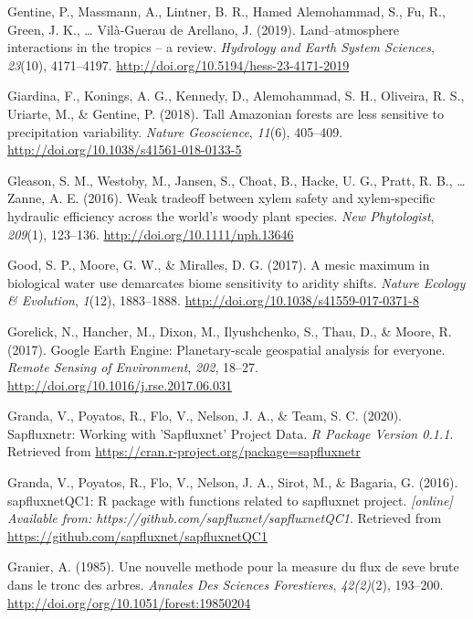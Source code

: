 \documentclass[11pt,twoside]{reedthesis}
\begin{document}
\hypertarget{ref-gentine_landatmosphere_2019}{}
Gentine, P., Massmann, A., Lintner, B. R., Hamed Alemohammad, S., Fu,
R., Green, J. K., \ldots{} Vilà-Guerau de Arellano, J. (2019).
Land--atmosphere interactions in the tropics -- a review.
\emph{Hydrology and Earth System Sciences}, \emph{23}(10), 4171--4197.
\url{http://doi.org/10.5194/hess-23-4171-2019}

\hypertarget{ref-giardina_tall_2018}{}
Giardina, F., Konings, A. G., Kennedy, D., Alemohammad, S. H., Oliveira,
R. S., Uriarte, M., \& Gentine, P. (2018). Tall Amazonian forests are
less sensitive to precipitation variability. \emph{Nature Geoscience},
\emph{11}(6), 405--409. \url{http://doi.org/10.1038/s41561-018-0133-5}

\hypertarget{ref-gleason_weak_2016}{}
Gleason, S. M., Westoby, M., Jansen, S., Choat, B., Hacke, U. G., Pratt,
R. B., \ldots{} Zanne, A. E. (2016). Weak tradeoff between xylem safety
and xylem-specific hydraulic efficiency across the world's woody plant
species. \emph{New Phytologist}, \emph{209}(1), 123--136.
\url{http://doi.org/10.1111/nph.13646}

\hypertarget{ref-good2017}{}
Good, S. P., Moore, G. W., \& Miralles, D. G. (2017). A mesic maximum in
biological water use demarcates biome sensitivity to aridity shifts.
\emph{Nature Ecology \& Evolution}, \emph{1}(12), 1883--1888.
\url{http://doi.org/10.1038/s41559-017-0371-8}

\hypertarget{ref-gorelick_google_2017}{}
Gorelick, N., Hancher, M., Dixon, M., Ilyushchenko, S., Thau, D., \&
Moore, R. (2017). Google Earth Engine: Planetary-scale geospatial
analysis for everyone. \emph{Remote Sensing of Environment}, \emph{202},
18--27. \url{http://doi.org/10.1016/j.rse.2017.06.031}

\hypertarget{ref-granda_sapfluxnetr_2020}{}
Granda, V., Poyatos, R., Flo, V., Nelson, J. A., \& Team, S. C. (2020).
Sapfluxnetr: Working with 'Sapfluxnet' Project Data. \emph{R Package
Version 0.1.1}. Retrieved from
\url{https://cran.r-project.org/package=sapfluxnetr}

\hypertarget{ref-granda2016}{}
Granda, V., Poyatos, R., Flo, V., Nelson, J. A., Sirot, M., \& Bagaria,
G. (2016). sapfluxnetQC1: R package with functions related to sapfluxnet
project. \emph{{[}online{]} Available from:
https://github.com/sapfluxnet/sapfluxnetQC1}. Retrieved from
\url{https://github.com/sapfluxnet/sapfluxnetQC1}

\hypertarget{ref-Granier1985}{}
Granier, A. (1985). Une nouvelle methode pour la measure du flux de seve
brute dans le tronc des arbres. \emph{Annales Des Sciences Forestieres},
\emph{42(2)}(2), 193--200.
\url{http://doi.org/org/10.1051/forest:19850204}
\end{document}
